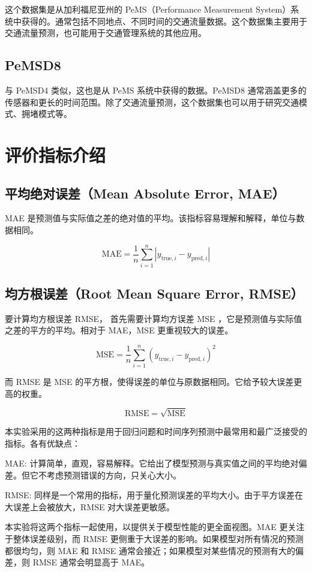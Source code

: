 \documentclass[4pt]{article}
\begin{document}
这个数据集是从加利福尼亚州的 PeMS（Performance Measurement System）系统中获得的。通常包括不同地点、不同时间的交通流量数据。这个数据集主要用于交通流量预测，也可能用于交通管理系统的其他应用。

\subsection{PeMSD8}

与 PeMSD4 类似，这也是从 PeMS 系统中获得的数据。PeMSD8 通常涵盖更多的传感器和更长的时间范围。除了交通流量预测，这个数据集也可以用于研究交通模式、拥堵模式等。


\section{评价指标介绍}

\subsection{平均绝对误差（Mean Absolute Error, MAE）}

MAE 是预测值与实际值之差的绝对值的平均。该指标容易理解和解释，单位与数据相同。

\[
\text{MAE} = \frac{1}{n} \sum_{i=1}^{n} \left| y_{\text{true}, i} - y_{\text{pred}, i} \right|
\]

\subsection{均方根误差（Root Mean Square Error, RMSE）}

要计算均方根误差 RMSE， 首先需要计算均方误差 MSE ，它是预测值与实际值之差的平方的平均。相对于 MAE，MSE 更重视较大的误差。

\[
\text{MSE} = \frac{1}{n} \sum_{i=1}^{n} \left( y_{\text{true}, i} - y_{\text{pred}, i} \right)^2
\]

而 RMSE 是 MSE 的平方根，使得误差的单位与原数据相同。它给予较大误差更高的权重。

\[
\text{RMSE} = \sqrt{\text{MSE}}
\]

本实验采用的这两种指标是用于回归问题和时间序列预测中最常用和最广泛接受的指标。各有优缺点：

MAE: 计算简单，直观，容易解释。它给出了模型预测与真实值之间的平均绝对偏差。但它不考虑预测错误的方向，只关心大小。

RMSE: 同样是一个常用的指标，用于量化预测误差的平均大小。由于平方误差在大误差上会被放大，RMSE 对大误差更敏感。

本实验将这两个指标一起使用，以提供关于模型性能的更全面视图。MAE 更关注于整体误差级别，而 RMSE 更侧重于大误差的影响。如果模型对所有情况的预测都很均匀，则 MAE 和 RMSE 通常会接近；如果模型对某些情况的预测有大的偏差，则 RMSE 通常会明显高于 MAE。
\end{document}
